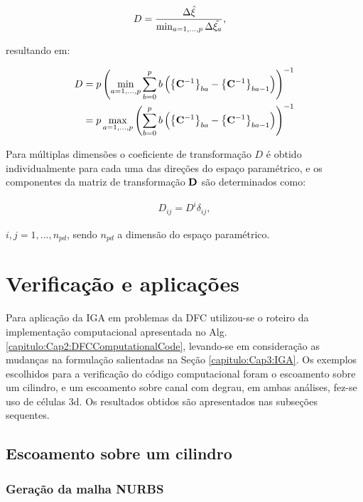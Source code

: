 \documentclass[tese_patricia]{subfiles}
\begin{document}
\begin{align}
	D&=\frac{\Delta\hat{\xi}}{\min_{a=1,...,p} \Delta\tilde{\xi_{a}}},
\end{align}

\noindent resultando em:

\begin{align}
	D&={p}\left(\min_{a=1,...,p} \sum_{b=0}^{p} b \left(\left\{\mathbf{C}^{-1}\right\}_{ba} - \left\{\mathbf{C}^{-1}\right\}_{ba-1}\right)\right)^{-1} \\
	  &={p}\max_{a=1,...,p}\left(\sum_{b=0}^{p} b \left(\left\{\mathbf{C}^{-1}\right\}_{ba} - \left\{\mathbf{C}^{-1}\right\}_{ba-1}\right)\right)^{-1}
\end{align}

Para múltiplas dimensões o coeficiente de transformação $D$ é obtido individualmente para cada uma das direções do espaço paramétrico, e os componentes da matriz de transformação $\mathbf{D}$ são determinados como:

\begin{align}
	D_{ij} = D^{i} \delta_{ij},
\end{align}

\noindent $i,j = 1,...,n_{pd}$, sendo $n_{pd}$ a dimensão do espaço paramétrico.


\section{Verificação e aplicações}

Para aplicação da IGA em problemas da DFC utilizou-se o roteiro da implementação computacional apresentada no Alg. \ref{capitulo:Cap2:DFCComputationalCode}, levando-se em consideração as mudanças na formulação salientadas na Seção \ref{capitulo:Cap3:IGA}. Os exemplos escolhidos para a verificação do código computacional foram o escoamento sobre um cilindro, e um escoamento sobre canal com degrau, em ambas análises, fez-se uso de células 3d. Os resultados obtidos são apresentados nas subseções sequentes.

\subsection {Escoamento sobre um cilindro}

\subsubsection {Geração da malha NURBS} \label{Cap3:VerApl:Cilindro:Malha}
\end{document}
